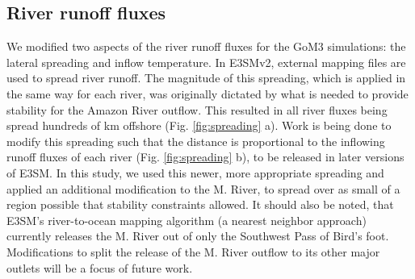 \subsection{River runoff fluxes}
We modified two aspects of the river runoff fluxes for the GoM3 simulations: the lateral spreading and inflow temperature. In E3SMv2, external mapping files are used to spread river runoff. The magnitude of this spreading, which is applied in the same way for each river, was originally dictated by what is needed to provide stability for the Amazon River outflow. This resulted in all river fluxes being spread hundreds of km offshore (Fig. \ref{fig:spreading} a). Work is being done to modify this spreading such that the distance is proportional to the inflowing runoff fluxes of each river (Fig. \ref{fig:spreading} b), to be released in later versions of E3SM. In this study, we used this newer, more appropriate spreading and applied an additional modification to the M. River, to spread over as small of a region possible that stability constraints allowed. It should also be noted, that E3SM's river-to-ocean mapping algorithm (a nearest neighbor approach) currently releases the M. River out of only the Southwest Pass of Bird's foot. Modifications to split the release of the M. River outflow to its other major outlets will be a focus of future work.

